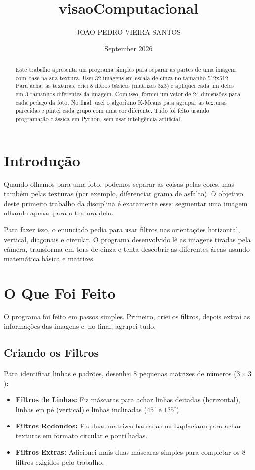\documentclass[twocolumn]{article}
\title{visaoComputacional}
\author{JOAO PEDRO VIEIRA SANTOS}
\date{September 2026}
\begin{document}
\maketitle

\begin{abstract}
Este trabalho apresenta um programa simples para separar as partes de uma imagem com base na sua textura. Usei 32 imagens em escala de cinza no tamanho 512x512. Para achar as texturas, criei 8 filtros básicos (matrizes 3x3) e apliquei cada um deles em 3 tamanhos diferentes da imagem. Com isso, formei um vetor de 24 dimensões para cada pedaço da foto. No final, usei o algoritmo K-Means para agrupar as texturas parecidas e pintei cada grupo com uma cor diferente. Tudo foi feito usando programação clássica em Python, sem usar inteligência artificial.
\end{abstract}

\section{Introdução}
Quando olhamos para uma foto, podemos separar as coisas pelas cores, mas também pelas texturas (por exemplo, diferenciar grama de asfalto). O objetivo deste primeiro trabalho da disciplina é exatamente esse: segmentar uma imagem olhando apenas para a textura dela.

Para fazer isso, o enunciado pedia para usar filtros nas orientações horizontal, vertical, diagonais e circular. O programa desenvolvido lê as imagens tiradas pela câmera, transforma em tons de cinza e tenta descobrir as diferentes áreas usando matemática básica e matrizes.

\section{O Que Foi Feito}
O programa foi feito em passos simples. Primeiro, criei os filtros, depois extraí as informações das imagens e, no final, agrupei tudo.

\subsection{Criando os Filtros}
Para identificar linhas e padrões, desenhei 8 pequenas matrizes de números ($3\times3$):
\begin{itemize}
    \item \textbf{Filtros de Linhas:} Fiz máscaras para achar linhas deitadas (horizontal), linhas em pé (vertical) e linhas inclinadas ($45^\circ$ e $135^\circ$).
    \item \textbf{Filtros Redondos:} Fiz duas matrizes baseadas no Laplaciano para achar texturas em formato circular e pontilhadas.
    \item \textbf{Filtros Extras:} Adicionei mais duas máscaras simples para completar os 8 filtros exigidos pelo trabalho.
\end{itemize}
\end{document}
